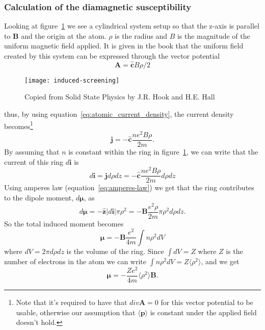 \documentclass[11pt]{article}
\begin{document}
\subsubsection{Calculation of the diamagnetic susceptibility}
Looking at figure~\ref{fig:induced-screening} we see a cylindrical system setup so that the z-axis is parallel to $\pmb{B}$ and the origin at the atom.  $\rho$ is the radius and $B$ is the magnitude of the uniform magnetic field applied. It is given in the book that the uniform field created by this system can be expressed through the vector potential 
\begin{equation}
	\pmb{A} = \pmb{\hat{c}} B \rho/2
\end{equation}
\begin{figure}[!ht]
	\centering
	\texttt{[image: induced-screening]}
	\caption{Copied from Solid State Physics by J.R. Hook and H.E. Hall}
	\label{fig:induced-screening}
\end{figure}
\newpage
thus, by using equation~\ref{eq:atomic_current_density}, the current density becomes\footnote{Note that it's required to have that $div \pmb{A} = 0$ for this vector potential to be usable, otherwise our assumption that $\langle \pmb{p} \rangle$ is constant under the applied field doesn't hold.}
\begin{equation}
	\pmb{j} =  - \pmb{\hat{c}} \frac{ne^2B\rho}{2m}.
\end{equation}
By assuming that $n$ is constant within the ring in figure~\ref{fig:induced-screening}, we can write that the current of this ring $d\pmb{i}$ is
\begin{equation}
	d\pmb{i} = \pmb{j} d\rho dz = - \pmb{\hat{c}} \frac{ne^2B\rho}{2m} d\rho dz
\end{equation}
Using amperes law (equation~\ref{eq:amperes-law}) we get that the ring contributes to the dipole moment, $d\pmb{\mu}$, as
\begin{equation}
	d\pmb{\mu} = - \pmb{\hat{z}} | d\pmb{i} | \pi \rho^2 = -\pmb{B} \frac{e^2\rho}{2m} \pi \rho^2 d\rho dz.
\end{equation}
So the total induced moment becomes
\begin{equation}
	\pmb{\mu} = - \pmb{B} \frac{e^2}{4m} \int n\rho^2 dV
\end{equation}
where $dV = 2\pi d\rho dz$ is the volume of the ring. Since $\int dV = Z$ where $Z$ is the number of electrons in the atom we can write $\int n\rho^2 dV = Z\langle \rho^2 \rangle$, and we get
\begin{equation}
	\pmb{\mu} = - \frac{Z e^2}{4m} \langle \rho^2 \rangle \pmb{B}.
	\label{eq:diamagnetic_dipole_moment}
\end{equation}
\end{document}
